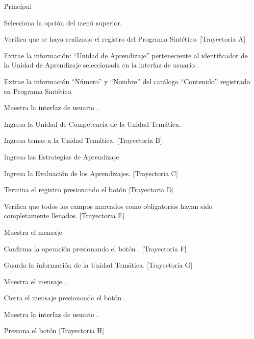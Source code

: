 \begin{UCtrayectoria}{Principal}
    
    \UCpaso[\UCactor] Selecciona la opción  del menú superior.
    
    \UCpaso Verifica que se haya realizado el registro del Programa Sintético. [Trayectoria A]
    
    \UCpaso Extrae la información: ``Unidad de Aprendizaje'' perteneciente al identificador de la Unidad de Aprendizaje seleccionada en la interfaz de usuario .
    
    \UCpaso Extrae la información ``Número'' y ``Nombre'' del catálogo ``Contenido'' registrado en Programa Sintético.
    
    \UCpaso Muestra la interfaz de usuario .
    
    \UCpaso[\UCactor] Ingresa la Unidad de Competencia de la Unidad Temática.
    
    \UCpaso[\UCactor] Ingresa temas a la Unidad Temática. [Trayectoria B]
    
    \UCpaso[\UCactor] Ingresa las Estrategias de Aprendizaje.
    
    \UCpaso[\UCactor] Ingresa la Evaluación de los Aprendizajes. [Trayectoria C]
    
    \UCpaso Termina el registro presionando el botón  [Trayectoria D]
    
    \UCpaso Verifica que todos los campos marcados como obligatorios hayan sido completamente llenados. [Trayectoria E]
    
    \UCpaso Muestra el mensaje 

    \UCpaso[\UCactor] Confirma la operación presionando el botón . [Trayectoria F]
    
    \UCpaso Guarda la información de la Unidad Temática. [Trayectoria G]
    
    \UCpaso Muestra el mensaje .
    
    \UCpaso[\UCactor] Cierra el mensaje presionando el botón .
    
    \UCpaso Muestra la interfaz de usuario .
    
    \UCpaso[\UCactor] Presiona el botón \IUbutton{$\succ$} [Trayectoria H]

\end{UCtrayectoria}

